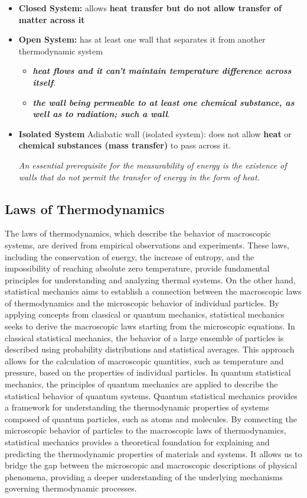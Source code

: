 \documentclass{article}
\begin{document}
\begin{itemize}
\item \textbf{Closed System:} allows \textbf{heat transfer but do not allow transfer of matter across it}
\item \textbf{Open System:} has at least one wall that separates it from another thermodynamic system
\begin{itemize}
    \item \textbf{\textit{heat flows and it can't maintain temperature difference across itself}}.
    \item \textbf{\textit{the wall being permeable to at least one chemical substance, as well as to radiation; such a wall}}.
\end{itemize}
\item \textbf{Isolated System} Adiabatic wall (isolated system): does not allow \textbf{heat} or \textbf{chemical substances (mass transfer)} to pass across it.

\textit{An essential prerequisite for the measurability of energy is the existence of walls that do not permit the transfer of
energy in the form of heat.}
\end{itemize}

\subsection{Laws of Thermodynamics}

The laws of thermodynamics, which describe the behavior of macroscopic systems, are derived from empirical observations and experiments. These laws, including the conservation of energy, the increase of entropy, and the impossibility of reaching absolute zero temperature, provide fundamental principles for understanding and analyzing thermal systems.
On the other hand, statistical mechanics aims to establish a connection between the macroscopic laws of thermodynamics and the microscopic behavior of individual particles. By applying concepts from classical or quantum mechanics, statistical mechanics seeks to derive the macroscopic laws starting from the microscopic equations.
In classical statistical mechanics, the behavior of a large ensemble of particles is described using probability distributions and statistical averages. This approach allows for the calculation of macroscopic quantities, such as temperature and pressure, based on the properties of individual particles.
In quantum statistical mechanics, the principles of quantum mechanics are applied to describe the statistical behavior of quantum systems. Quantum statistical mechanics provides a framework for understanding the thermodynamic properties of systems composed of quantum particles, such as atoms and molecules.
By connecting the microscopic behavior of particles to the macroscopic laws of thermodynamics, statistical mechanics provides a theoretical foundation for explaining and predicting the thermodynamic properties of materials and systems. It allows us to bridge the gap between the microscopic and macroscopic descriptions of physical phenomena, providing a deeper understanding of the underlying mechanisms governing thermodynamic processes.
\end{document}
